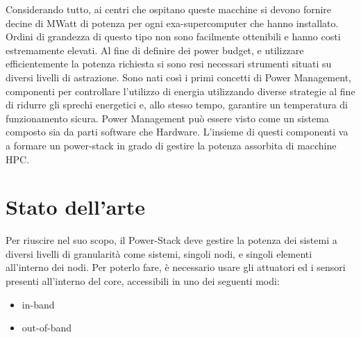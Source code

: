 Considerando tutto, ai centri che ospitano queste macchine si devono fornire decine di MWatt di potenza per ogni exa-supercomputer che hanno installato. 
Ordini di grandezza di questo tipo non sono facilmente ottenibili e hanno costi estremamente elevati. 
Al fine di definire dei power budget, e utilizzare efficientemente la potenza richiesta si sono resi necessari strumenti situati su diversi livelli di astrazione. 
Sono nati così i primi concetti di Power Management, componenti per controllare l'utilizzo di energia utilizzando diverse strategie al fine di ridurre gli sprechi energetici e, allo stesso tempo, garantire un temperatura di funzionamento sicura.
Power Management può essere visto come un sistema composto sia da parti software che Hardware. L'insieme di questi componenti va a formare un power-stack in grado di gestire la potenza assorbita di macchine HPC.

\section{Stato dell'arte}
Per riuscire nel suo scopo, il Power-Stack deve gestire la potenza dei sistemi a diversi livelli di granularità come sistemi, singoli nodi, e singoli elementi all'interno dei nodi. Per poterlo fare, è necessario usare gli attuatori ed i sensori presenti all'interno del core, accessibili in uno dei seguenti modi:
\begin{itemize}
    \item in-band
    \item out-of-band
\end{itemize}

